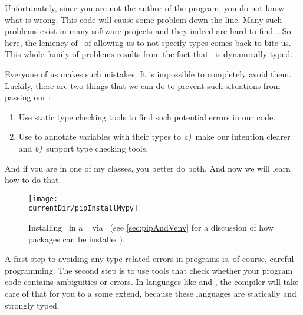Unfortunately, since you are not the author of the program, you do not know what is wrong.
This code will cause some problem down the line.
Many such problems exist in many software projects and they indeed are hard to find~\cite{KCVM2022AESOTRDIPP}.
So here, the leniency of \python\ of allowing us to not specify types comes back to bite us.
This whole family of problems results from the fact that \python\ is dynamically-typed.

Everyone of us makes such mistakes.
It is impossible to completely avoid them.
Luckily, there are two things that we can do to prevent such situations from passing our :%
%
\begin{enumerate}%
%
\item Use static type checking tools to find such potential errors in our code.%
%
\item Use  to annotate variables with their types to \emph{a)}~make our intention clearer and \emph{b)}~support type checking tools.%
%
\end{enumerate}%
%
And if you are in one of my classes, you better do both.
And now we will learn how to do that.%
\endhsection%
%
%
%
%
\begin{figure}%
\centering%
\texttt{[image: \\currentDir/pipInstallMypy]}%
\caption{Installing \mypy\ in a \ubuntu\  via \pip~(see \cref{sec:pipAndVenv} for a discussion of how packages can be installed).}%
\label{fig:pipInstallMypy}%
\end{figure}%
%
%
%
%
%
%
%
A first step to avoiding any type-related errors in programs is, of course, careful programming.
The second step is to use tools that check whether your program code contains ambiguities or errors.
In languages like  and , the compiler will take care of that for you to a some extend, because these languages are statically and strongly typed.

